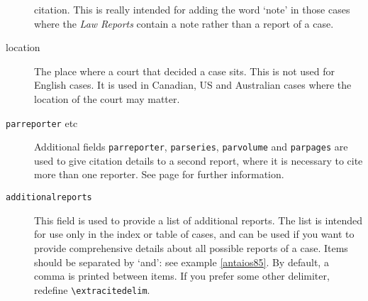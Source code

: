 \documentclass[a4paper,
               11pt,
	       DIV=1,			   
	       footinclude=false]
	      {scrartcl}
\begin{document}
\begin{description}
  citation. This is really intended for adding the word `note' in
  those cases where the \emph{Law Reports} contain a note rather than
  a report of a case.
\item[location]
The place where a court that decided a case sits. This
is not used for English cases. It is used in Canadian, US and
Australian cases where the location of the court may matter.
\item[\texttt{parreporter} etc]
Additional fields \texttt{parreporter},
\texttt{parseries}, \texttt{parvolume} and \texttt{parpages} are used
to give citation details to a second report, where it is necessary to
cite more than one reporter. See page \pageref{parallel:reports} for
further information.
\item[\texttt{additionalreports}]
This field is used to provide a list
of additional reports. The list is intended for use only in the index
or table of cases, and can be used if you want to provide
comprehensive details about all possible reports of a case. Items should be separated by `and': see example \ref{antaios85}. By default, a comma is printed between items. If you prefer some other delimiter, redefine \verb|\extracitedelim|.
\end{description}
\end{document}
